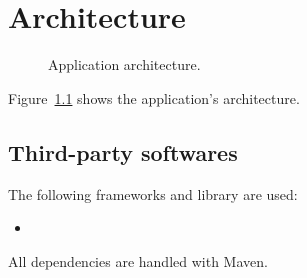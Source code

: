 \chapter{Architecture}\label{ch:arch}

\begin{figure}[p]
	\caption{Application architecture.}
	\label{fig:arch}
\end{figure}

Figure~\ref{fig:arch} shows the application's architecture.

\section{Third-party softwares}\label{sec:thirdparty}

The following frameworks and library are used:
\begin{itemize}
	\item \textellipsis
\end{itemize}

All dependencies are handled with Maven.
